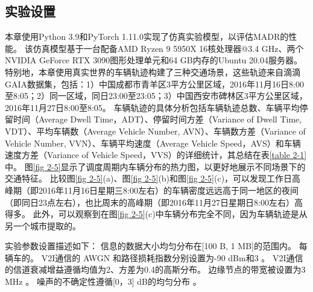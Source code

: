 \subsection[\hspace{-2pt}实验设置]{{ \hspace{-8pt}实验设置}}
本章使用Python 3.9和PyTorch 1.11.0实现了仿真实验模型，以评估MADR的性能。
该仿真模型基于一台配备AMD Ryzen 9 5950X 16核处理器@3.4 GHz、两个NVIDIA GeForce RTX 3090图形处理单元和64 GB内存的Ubuntu 20.04服务器。
特别地，本章使用真实世界的车辆轨迹构建了三种交通场景，这些轨迹来自滴滴GAIA数据集，包括：1）中国成都市青羊区3平方公里区域，2016年11月16日8:00至8:05；2）同一区域，同日23:00至23:05；3）中国西安市碑林区3平方公里区域，2016年11月27日8:00至8:05。
车辆轨迹的具体分析包括车辆轨迹总数、车辆平均停留时间（Average Dwell Time，ADT）、停留时间方差（Variance of Dwell Time, VDT）、平均车辆数（Average Vehicle Number, AVN）、车辆数方差（Variance of Vehicle Number, VVN）、车辆平均速度（Average Vehicle Speed，AVS）和车辆速度方差（Variance of Vehicle Speed，VVS）的详细统计，其总结在表\ref{table 2-1}中。
图\ref{fig 2-5}显示了调度周期内车辆分布的热力图，以更好地展示不同场景下的交通特征。
比较图\ref{fig 2-5}(a)、图\ref{fig 2-5}(b)和图\ref{fig 2-5}(c)，可以发现工作日高峰期（即2016年11月16日星期三8:00左右）的车辆密度远远高于同一地区的夜间（即同日23点左右），也比周末的高峰期（即2016年11月27日星期日8:00左右）高得多。
此外，可以观察到在图\ref{fig 2-5}(c)中车辆分布完全不同，因为车辆轨迹是从另一个城市提取的。

实验参数设置描述如下：
信息的数据大小均匀分布在[100 B, 1 MB]的范围内。
每辆车的。
V2I通信的 AWGN 和路径损耗指数分别设置为-90 dBm和3 \cite{sadek2009distributed}。
V2I通信的信道衰减增益遵循均值为2、方差为0.4的高斯分布。
边缘节点的带宽被设置为3 MHz \cite{wang2019delay}。
噪声的不确定性遵循[0，3] dB的均匀分布 \cite{tandra2008snr}。

\begin{table}[h]\small
{} %
\centering
{}
\label{table 2-1}
\end{table}

